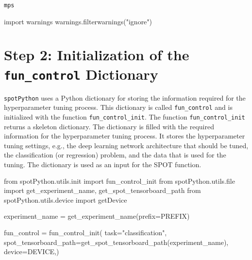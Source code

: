 \documentclass[
  letterpaper,
  DIV=11,
  numbers=noendperiod]{scrreprt}
\newenvironment{Shaded}{\begin{snugshade}}{\end{snugshade}}
\newcommand{\BuiltInTok}[1]{\textcolor[rgb]{0.00,0.23,0.31}{#1}}
\newcommand{\ImportTok}[1]{\textcolor[rgb]{0.00,0.46,0.62}{#1}}
\newcommand{\NormalTok}[1]{\textcolor[rgb]{0.00,0.23,0.31}{#1}}
\newcommand{\OperatorTok}[1]{\textcolor[rgb]{0.37,0.37,0.37}{#1}}
\newcommand{\StringTok}[1]{\textcolor[rgb]{0.13,0.47,0.30}{#1}}
\begin{document}
\begin{verbatim}
mps
\end{verbatim}

\begin{Shaded}
\begin{Highlighting}[]
\ImportTok{import}\NormalTok{ warnings}
\NormalTok{warnings.filterwarnings(}\StringTok{"ignore"}\NormalTok{)}
\end{Highlighting}
\end{Shaded}

\hypertarget{sec-initialization-fun-control-14}{%
\section{\texorpdfstring{Step 2: Initialization of the
\texttt{fun\_control}
Dictionary}{Step 2: Initialization of the fun\_control Dictionary}}\label{sec-initialization-fun-control-14}}

\texttt{spotPython} uses a Python dictionary for storing the information
required for the hyperparameter tuning process. This dictionary is
called \texttt{fun\_control} and is initialized with the function
\texttt{fun\_control\_init}. The function \texttt{fun\_control\_init}
returns a skeleton dictionary. The dictionary is filled with the
required information for the hyperparameter tuning process. It stores
the hyperparameter tuning settings, e.g., the deep learning network
architecture that should be tuned, the classification (or regression)
problem, and the data that is used for the tuning. The dictionary is
used as an input for the SPOT function.

\begin{Shaded}
\begin{Highlighting}[]
\ImportTok{from}\NormalTok{ spotPython.utils.init }\ImportTok{import}\NormalTok{ fun\_control\_init}
\ImportTok{from}\NormalTok{ spotPython.utils.}\BuiltInTok{file} \ImportTok{import}\NormalTok{ get\_experiment\_name, get\_spot\_tensorboard\_path}
\ImportTok{from}\NormalTok{ spotPython.utils.device }\ImportTok{import}\NormalTok{ getDevice}

\NormalTok{experiment\_name }\OperatorTok{=}\NormalTok{ get\_experiment\_name(prefix}\OperatorTok{=}\NormalTok{PREFIX)}

\NormalTok{fun\_control }\OperatorTok{=}\NormalTok{ fun\_control\_init(}
\NormalTok{    task}\OperatorTok{=}\StringTok{"classification"}\NormalTok{,}
\NormalTok{    spot\_tensorboard\_path}\OperatorTok{=}\NormalTok{get\_spot\_tensorboard\_path(experiment\_name),}
\NormalTok{    device}\OperatorTok{=}\NormalTok{DEVICE,)}
\end{Highlighting}
\end{Shaded}
\end{document}
